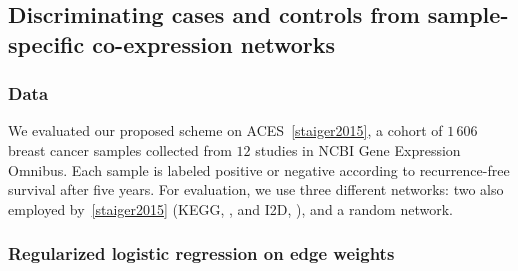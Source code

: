 \documentclass{bioinfo}
\begin{document}
\begin{methods}
\subsection{Discriminating cases and controls  from sample-specific co-expression networks}

\subsubsection{Data}
We evaluated our proposed scheme on ACES~\ref{staiger2015}, a cohort of $1\,606$ breast cancer samples collected from $12$ studies in NCBI Gene Expression Omnibus.
Each sample is labeled positive or negative according to recurrence-free survival after five years. 
For evaluation, we use three different networks: two also employed by~\ref{staiger2015} (KEGG, , and I2D, ), and a random network.




\subsubsection{Regularized logistic regression on edge weights}


\end{methods}
\end{document}
